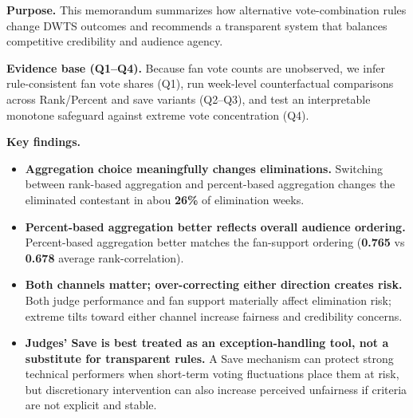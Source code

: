 {\begin{minipage}{0.97\textwidth}

\noindent\textbf{Purpose.}
This memorandum summarizes how alternative vote-combination rules change DWTS outcomes and recommends a transparent system that balances competitive credibility and audience agency.

\vspace{0.4em}

\noindent\textbf{Evidence base (Q1--Q4).}
Because fan vote counts are unobserved, we infer rule-consistent fan vote shares (Q1), run week-level counterfactual comparisons across Rank/Percent and save variants (Q2–Q3), and test an interpretable monotone safeguard against extreme vote concentration (Q4).

\vspace{0.4em}

\noindent\textbf{Key findings.}
\begin{itemize}
    \item \textbf{Aggregation choice meaningfully changes eliminations.}
    Switching between rank-based aggregation and percent-based aggregation changes the eliminated contestant in abou \textbf{26\%} of elimination weeks.

    \item \textbf{Percent-based aggregation better reflects overall audience ordering.}
    Percent-based aggregation better matches the fan-support ordering (\textbf{0.765} vs \textbf{0.678} average rank-correlation).

    \item \textbf{Both channels matter; over-correcting either direction creates risk.}
    Both judge performance and fan support materially affect elimination risk; extreme tilts toward either channel increase fairness and credibility concerns.

    \item \textbf{Judges’ Save is best treated as an exception-handling tool, not a substitute for transparent rules.}
    A Save mechanism can protect strong technical performers when short-term voting fluctuations place them at risk, but discretionary intervention can also increase perceived unfairness if criteria are not explicit and stable.
\end{itemize}

\vspace{0.4em}


\end{minipage}}

